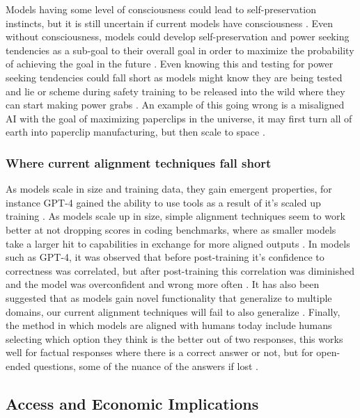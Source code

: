 Models having some level of consciousness could lead to self-preservation instincts, but it is still uncertain if current models have consciousness \citep{ward_towards_2025, butlin_consciousness_2023}. Even without consciousness, models could develop self-preservation and power seeking tendencies as a sub-goal to their overall goal in order to maximize the probability of achieving the goal in the future \citep{bostrom_superintelligent_2012}. Even knowing this and testing for power seeking tendencies could fall short as models might know they are being tested and lie or scheme during safety training to be released into the wild where they can start making power grabs \citep{carlsmith_scheming_2023}. An example of this going wrong is a misaligned AI with the goal of maximizing paperclips in the universe, it may first turn all of earth into paperclip manufacturing, but then scale to space \citep{bostrom_ethical_2003}.

\subsubsection{Where current alignment techniques fall short}

As models scale in size and training data, they gain emergent properties, for instance GPT-4 gained the ability to use tools as a result of it's scaled up training \citep{bubeck_sparks_2023}. As models scale up in size, simple alignment techniques seem to work better at not dropping scores in coding benchmarks, where as smaller models take a larger hit to capabilities in exchange for more aligned outputs \citep{askell_general_2021}. In models such as GPT-4, it was observed that before post-training it's confidence to correctness was correlated, but after post-training this correlation was diminished and the model was overconfident and wrong more often \citep{openai_gpt_4_2023}. It has also been suggested that as models gain novel functionality that generalize to multiple domains, our current alignment techniques will fail to also generalize \citep{soares_central_2022}. Finally, the method in which models are aligned with humans today include humans selecting which option they think is the better out of two responses, this works well for factual responses where there is a correct answer or not, but for open-ended questions, some of the nuance of the answers if lost \citep{song_reward_2023}.

\subsection{Access and Economic Implications}

